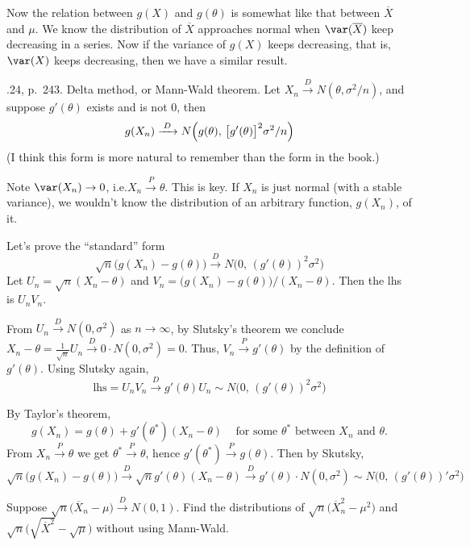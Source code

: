 \documentclass[12pt]{article}
\begin{document}
Now the relation between $g(X)$ and $g(\theta)$ is somewhat like
that between $\overline{X}$ and $\mu$.
We know the distribution of $\overline{X}$ approaches normal
when $\var(\overline{X})$ keep decreasing in a series.
Now if the variance of $g(X)$ keeps decreasing,
that is, $\var(X)$ keeps decreasing, then we have a similar result.

.24, p.~243. Delta method, or Mann-Wald theorem.
Let $X_n \xrightarrow{\;D\;}  N(\theta, \sigma^2/n)$,
and suppose $g'(\theta)$ exists and is not 0, then
\[
g(X_n) \xrightarrow{\;D\;}
    N\Bigl(g(\theta),\, \bigl[g'(\theta)\bigr]^2 \sigma^2/n\Bigr)
\]
(I think this form is more natural to remember than the form in the book.)

Note $\var(X_n) \to 0$, i.e.\@ $X_n \xrightarrow{\;P\;} \theta$.
This is key.
If $X_n$ is just normal (with a stable variance),
we wouldn't know the distribution of an arbitrary function,
$g(X_n)$, of it.

\alert[Proof 1]%
Let's prove the ``standard'' form
\[
\sqrt{n}\bigl(g(X_n) - g(\theta)\bigr) \xrightarrow{\;D\;}
    N\bigl(0,\, (g'(\theta))^2 \sigma^2\bigr)
\]
Let $U_n = \sqrt{n}(X_n - \theta)$
and $V_n = \bigl(g(X_n) - g(\theta)\bigr) / (X_n - \theta)$.
Then the lhs is $U_n V_n$.

From $U_n \xrightarrow{\;D\;} N(0, \sigma^2)$ as $n\to \infty$,
by Slutsky's theorem we conclude
$X_n - \theta = \frac{1}{\sqrt{n}} U_n
    \xrightarrow{\;D\;} 0\cdot N(0,\sigma^2) = 0$.
Thus,
$V_n \xrightarrow{\;P\;} g'(\theta)$ by the definition of $g'(\theta)$.
Using Slutsky again,
\[
\text{lhs} = U_n V_n
\xrightarrow{\;D\;} g'(\theta) U_n \sim N\bigl(0,\, (g'(\theta))^2 \sigma^2\bigr)
\]

\alert[Proof 2]%
By Taylor's theorem,
\[
g(X_n) = g(\theta) + g'(\theta^*) (X_n - \theta)
\,\quad
\text{for some $\theta^*$ between $X_n$ and $\theta$}.
\]
From $X_n \xrightarrow{\;P\;} \theta$ we get
$\theta^* \xrightarrow{\;P\;} \theta$, hence
$g'(\theta^*) \xrightarrow{\;P\;} g(\theta)$.
Then by Skutsky,
\[
\sqrt{n}\bigl(g(X_n) - g(\theta)\bigr)
\xrightarrow{\;D\;}
    \sqrt{n} g'(\theta) (X_n - \theta)
\xrightarrow{\;D\;}
    g'(\theta) \cdot N(0, \sigma^2)
\sim N\bigl(0,\, (g'(\theta))' \sigma^2\bigr)
\]

\example
Suppose $\sqrt{n}\bigl(\overline{X}_n - \mu\bigr)
    \xrightarrow{\;D\;} N(0,1)$.
Find the distributions of
$\sqrt{n}\bigl(\overline{X}^2_n - \mu^2\bigr)$ and
$\sqrt{n}\bigl(\sqrt{\overline{X}^2} - \sqrt{\mu}\bigr)$
without using Mann-Wald.
\end{document}
